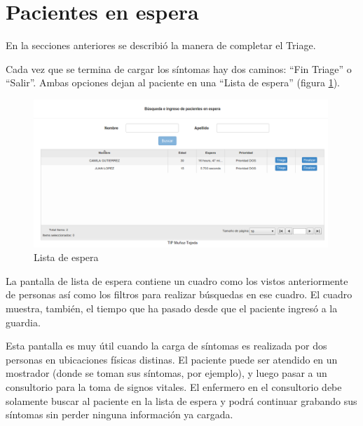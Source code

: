 \section{Pacientes en espera}
En la secciones anteriores se describió la manera de completar el Triage. 

Cada vez que se termina de cargar los síntomas hay dos caminos: ``Fin Triage'' o ``Salir''. Ambas opciones dejan al paciente en una ``Lista de espera'' (figura \ref{fig:espera}).
\begin{figure}
\centerline{\includegraphics[width=0.99\textwidth]{espera.png}}
\caption{Lista de espera} \label{fig:espera}
\end{figure}
 La pantalla de lista de espera contiene un cuadro como los vistos anteriormente de personas así como los filtros para realizar búsquedas en ese cuadro. El cuadro muestra, también, el tiempo que ha pasado desde que el paciente ingresó a la guardia.

Esta pantalla es muy útil cuando la carga de síntomas es realizada por dos personas en ubicaciones físicas distinas. El paciente puede ser atendido en un mostrador (donde se toman sus síntomas, por ejemplo), y luego pasar a un consultorio para la toma de signos vitales. El enfermero en el consultorio debe solamente buscar al paciente en la lista de espera y podrá continuar grabando sus síntomas sin perder ninguna información ya cargada.

